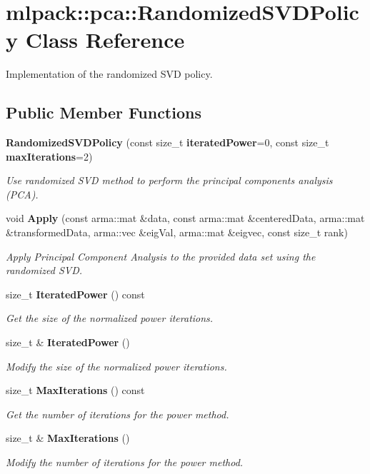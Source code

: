 \section{mlpack\+:\+:pca\+:\+:Randomized\+S\+V\+D\+Policy Class Reference}
\label{classmlpack_1_1pca_1_1RandomizedSVDPolicy}


Implementation of the randomized S\+VD policy.  


\subsection*{Public Member Functions}
\begin{DoxyCompactItemize}
\item 
{\bf Randomized\+S\+V\+D\+Policy} (const size\+\_\+t {\bf iterated\+Power}=0, const size\+\_\+t {\bf max\+Iterations}=2)
\begin{DoxyCompactList}\small\item\em Use randomized S\+VD method to perform the principal components analysis (P\+CA). \end{DoxyCompactList}\item 
void {\bf Apply} (const arma\+::mat \&data, const arma\+::mat \&centered\+Data, arma\+::mat \&transformed\+Data, arma\+::vec \&eig\+Val, arma\+::mat \&eigvec, const size\+\_\+t rank)
\begin{DoxyCompactList}\small\item\em Apply Principal Component Analysis to the provided data set using the randomized S\+VD. \end{DoxyCompactList}\item 
size\+\_\+t {\bf Iterated\+Power} () const 
\begin{DoxyCompactList}\small\item\em Get the size of the normalized power iterations. \end{DoxyCompactList}\item 
size\+\_\+t \& {\bf Iterated\+Power} ()
\begin{DoxyCompactList}\small\item\em Modify the size of the normalized power iterations. \end{DoxyCompactList}\item 
size\+\_\+t {\bf Max\+Iterations} () const 
\begin{DoxyCompactList}\small\item\em Get the number of iterations for the power method. \end{DoxyCompactList}\item 
size\+\_\+t \& {\bf Max\+Iterations} ()
\begin{DoxyCompactList}\small\item\em Modify the number of iterations for the power method. \end{DoxyCompactList}\end{DoxyCompactItemize}
